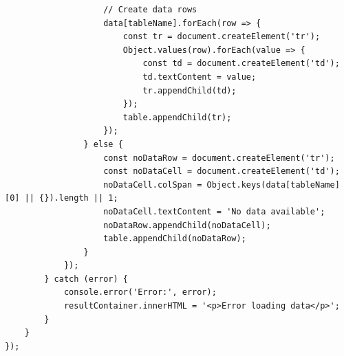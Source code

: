 \documentclass{report}
\begin{document}
\begin{verbatim}
                    // Create data rows
                    data[tableName].forEach(row => {
                        const tr = document.createElement('tr');
                        Object.values(row).forEach(value => {
                            const td = document.createElement('td');
                            td.textContent = value;
                            tr.appendChild(td);
                        });
                        table.appendChild(tr);
                    });
                } else {
                    const noDataRow = document.createElement('tr');
                    const noDataCell = document.createElement('td');
                    noDataCell.colSpan = Object.keys(data[tableName][0] || {}).length || 1;
                    noDataCell.textContent = 'No data available';
                    noDataRow.appendChild(noDataCell);
                    table.appendChild(noDataRow);
                }
            });
        } catch (error) {
            console.error('Error:', error);
            resultContainer.innerHTML = '<p>Error loading data</p>';
        }
    }
});
\end{verbatim}
\end{document}
